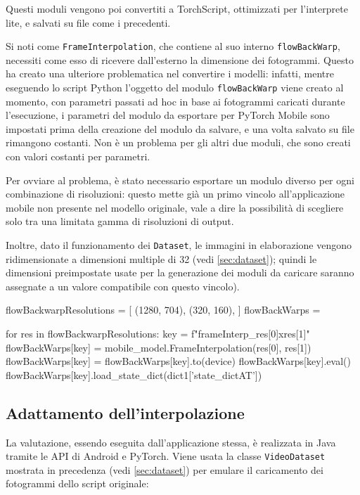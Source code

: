 Questi moduli vengono poi convertiti a TorchScript, ottimizzati per l'interprete lite, 
e salvati su file come i precedenti.

Si noti come \texttt{FrameInterpolation}, che contiene al suo interno \texttt{flowBackWarp}, 
necessiti come esso di ricevere dall'esterno la dimensione dei fotogrammi. Questo ha creato una
ulteriore problematica nel convertire i modelli: infatti, mentre eseguendo lo script Python
l'oggetto del modulo \texttt{flowBackWarp} viene creato al momento, con parametri passati ad
hoc in base ai fotogrammi caricati durante l'esecuzione, i parametri del modulo da esportare
per PyTorch Mobile sono impostati prima della creazione del modulo da salvare, e una volta 
salvato su file rimangono costanti. Non è un problema per gli altri due moduli, che sono creati
con valori costanti per parametri. 

Per ovviare al problema, è stato necessario esportare un modulo diverso per ogni combinazione
di risoluzioni: questo mette già un primo vincolo all'applicazione mobile non presente
nel modello originale, vale a dire la possibilità di scegliere solo tra una limitata gamma di
risoluzioni di output.

Inoltre, dato il funzionamento dei \texttt{Dataset}, le immagini in elaborazione vengono 
ridimensionate a dimensioni multiple di 32 (vedi \ref{sec:dataset}); quindi le dimensioni 
preimpostate usate per la generazione dei moduli da caricare saranno assegnate a 
un valore compatibile con questo vincolo).

\begin{Python}
flowBackwarpResolutions = [
    (1280, 704),
    (320, 160),
]
flowBackWarps = {}

for res in flowBackwarpResolutions:
    key = f"frameInterp_{res[0]}x{res[1]}"
    flowBackWarps[key] = mobile_model.FrameInterpolation(res[0], res[1])
    flowBackWarps[key] = flowBackWarps[key].to(device)
    flowBackWarps[key].eval()
    flowBackWarps[key].load_state_dict(dict1['state_dictAT'])
\end{Python}

\subsection{Adattamento dell'interpolazione}

La valutazione, essendo eseguita dall'applicazione stessa, è realizzata in Java
tramite le API di Android e PyTorch. Viene usata la classe \texttt{VideoDataset} mostrata in
precedenza (vedi \ref{sec:dataset}) per emulare il caricamento dei fotogrammi dello script
originale:

